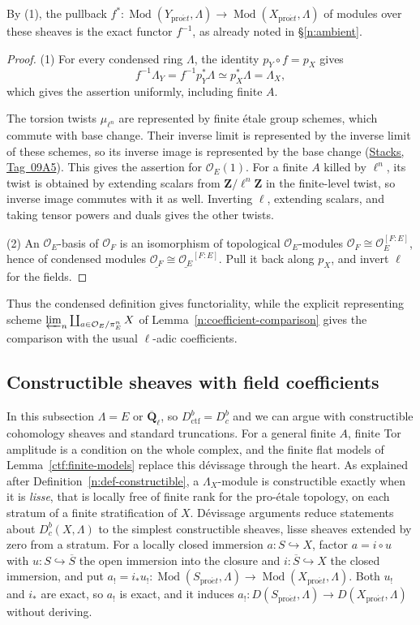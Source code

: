 \documentclass[11pt,a4paper]{article}
\numberwithin{equation}{section}
\theoremstyle{definition}
\theoremstyle{remark}
\newcommand{\D}{D}
\newcommand{\Dbc}{D^b_c}
\newcommand{\Mod}{\operatorname{Mod}}
\newcommand{\Qbar}{\overline{\mathbf Q}_\ell}
\newcommand{\proet}{\mathrm{pro}\acute{e}t}
\newcommand{\stacks}[1]{\href{https://stacks.math.columbia.edu/tag/#1}{\textnormal{Stacks, Tag~#1}}}
\newcommand{\Dctf}{D^b_{\mathrm{ctf}}}
\begin{document}
By (1), the pullback $f^*\colon\Mod(Y_{\proet},\Lambda)\to\Mod(X_{\proet},\Lambda)$
of modules over these sheaves is the exact functor $f^{-1}$, as already noted in \S\ref{n:ambient}.

\begin{proof}
(1) For every condensed ring $\Lambda$, the identity $p_Y\circ f=p_X$
gives
\[
 f^{-1}\Lambda_Y=f^{-1}p_Y^*\Lambda\simeq p_X^*\Lambda=\Lambda_X,
\]
which gives the assertion uniformly, including finite $A$.

The torsion twists $\mu_{\ell^n}$ are represented by finite \'etale group
schemes, which commute with base change. Their inverse limit is
represented by the inverse limit of these schemes, so its inverse image
is represented by the base change (\stacks{09A5}). This gives the
assertion for $\mathcal O_E(1)$. For a finite $A$ killed by
$\ell^n$, its twist is obtained by extending scalars from
$\mathbf Z/\ell^n\mathbf Z$ in the finite-level twist, so inverse image
commutes with it as well. Inverting $\ell$, extending scalars, and
taking tensor powers and duals gives the other twists.

(2) An $\mathcal O_E$-basis of $\mathcal O_F$ is an isomorphism of
topological $\mathcal O_E$-modules $\mathcal O_F\cong\mathcal O_E^{[F:E]}$,
hence of condensed modules
$\underline{\mathcal O_F}\cong\underline{\mathcal O_E}^{[F:E]}$. Pull it
back along $p_X$, and invert $\ell$ for the fields.
\end{proof}

Thus the condensed definition gives functoriality, while the explicit
representing scheme $\varprojlim_n\coprod_{a\in\mathcal O_E/\pi_E^n}X$
of Lemma~\ref{n:coefficient-comparison} gives the comparison with the
usual $\ell$-adic coefficients.

\subsection{Constructible sheaves with field coefficients}

In this subsection $\Lambda=E$ or $\Qbar$, so $\Dctf=\Dbc$ and we can
argue with constructible cohomology sheaves and standard truncations.
For a general finite $A$, finite Tor amplitude is a condition on the whole complex, and
the finite flat models of Lemma~\ref{ctf:finite-models} replace this
d\'evissage through the heart. As explained after
Definition~\ref{n:def-constructible}, a $\Lambda_X$-module is
constructible exactly when it is \emph{lisse}, that is locally free of
finite rank for the pro-\'etale topology, on each stratum of a finite
stratification of $X$. D\'evissage arguments reduce statements about
$\Dbc(X,\Lambda)$ to the simplest constructible sheaves, lisse sheaves
extended by zero from a stratum. For a locally closed immersion $a:S\hookrightarrow X$,
factor $a=i\circ u$ with $u:S\hookrightarrow\overline S$ the open
immersion into the closure and $i:\overline S\hookrightarrow X$ the closed
immersion, and put
$a_!=i_*u_!\colon\Mod(S_{\proet},\Lambda)\to\Mod(X_{\proet},\Lambda)$.
Both $u_!$ and $i_*$ are exact, so $a_!$ is exact, and it induces
$a_!\colon\D(S_{\proet},\Lambda)\to\D(X_{\proet},\Lambda)$ without deriving.
\end{document}
